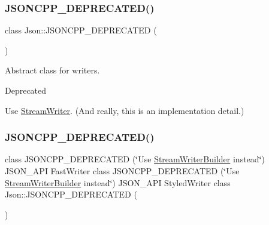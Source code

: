 \subsubsection{\texorpdfstring{J\+S\+O\+N\+C\+P\+P\+\_\+\+D\+E\+P\+R\+E\+C\+A\+T\+E\+D()}{JSONCPP\_DEPRECATED()}\hspace{0.1cm}{\footnotesize\ttfamily [1/2]}}
{\footnotesize\ttfamily class Json\+::\+J\+S\+O\+N\+C\+P\+P\+\_\+\+D\+E\+P\+R\+E\+C\+A\+T\+ED (\begin{DoxyParamCaption}\item[{\char`\"{}Use \hyperlink{classJson_1_1StreamWriter}{Stream\+Writer} instead\char`\"{}}]{ }\end{DoxyParamCaption})}



Abstract class for writers. 

\begin{DoxyRefDesc}{Deprecated}
\item[\hyperlink{deprecated__deprecated000007}{Deprecated}]Use \hyperlink{classJson_1_1StreamWriter}{Stream\+Writer}. (And really, this is an implementation detail.) \end{DoxyRefDesc}
\mbox{\label{namespaceJson_a9013c5f4f4ff260225b101a18af45262}} 
\subsubsection{\texorpdfstring{J\+S\+O\+N\+C\+P\+P\+\_\+\+D\+E\+P\+R\+E\+C\+A\+T\+E\+D()}{JSONCPP\_DEPRECATED()}\hspace{0.1cm}{\footnotesize\ttfamily [2/2]}}
{\footnotesize\ttfamily class J\+S\+O\+N\+C\+P\+P\+\_\+\+D\+E\+P\+R\+E\+C\+A\+T\+ED (\char`\"{}Use \hyperlink{classJson_1_1StreamWriterBuilder}{Stream\+Writer\+Builder} instead\char`\"{}) J\+S\+O\+N\+\_\+\+A\+PI Fast\+Writer class J\+S\+O\+N\+C\+P\+P\+\_\+\+D\+E\+P\+R\+E\+C\+A\+T\+ED (\char`\"{}Use \hyperlink{classJson_1_1StreamWriterBuilder}{Stream\+Writer\+Builder} instead\char`\"{}) J\+S\+O\+N\+\_\+\+A\+PI Styled\+Writer class Json\+::\+J\+S\+O\+N\+C\+P\+P\+\_\+\+D\+E\+P\+R\+E\+C\+A\+T\+ED (\begin{DoxyParamCaption}\item[{\char`\"{}Use \hyperlink{classJson_1_1StreamWriterBuilder}{Stream\+Writer\+Builder} instead\char`\"{}}]{ }\end{DoxyParamCaption})}



